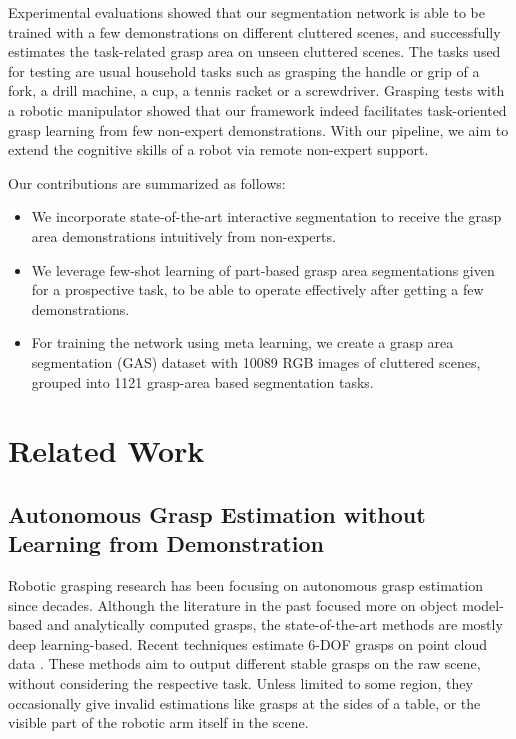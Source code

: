\documentclass[letterpaper]{article} %
\begin{document}
Experimental evaluations showed that our segmentation network is able to be trained with a few demonstrations on different cluttered scenes, and successfully estimates the task-related grasp area on unseen cluttered scenes. The tasks used for testing are usual household tasks such as grasping the handle or grip of a fork, a drill machine, a cup, a tennis racket or a screwdriver. Grasping tests with a robotic manipulator showed that our framework indeed facilitates task-oriented grasp learning from few non-expert demonstrations. With our pipeline, we aim to extend the cognitive skills of a robot via remote non-expert support.

Our contributions are summarized as follows:
\begin{itemize}
\item We incorporate state-of-the-art interactive segmentation to receive the grasp area demonstrations intuitively from non-experts. 

\item We leverage few-shot learning of part-based grasp area segmentations given for a prospective task, to be able to operate effectively after getting a few demonstrations.

\item For training the network using meta learning, we create a  grasp area segmentation (GAS) dataset with 10089 RGB images of cluttered scenes, grouped into 1121 grasp-area based segmentation tasks. 
\end{itemize}


\section{Related Work}
\label{sec:related}

\subsection{Autonomous Grasp Estimation without Learning from Demonstration}
Robotic grasping research has been focusing on autonomous grasp estimation since decades. Although the literature in the past focused more on object model-based and analytically computed grasps, the state-of-the-art methods are mostly deep learning-based. Recent techniques estimate 6-DOF grasps on point cloud data  \cite{sundermeyer2021contact,mousavian20196,fang2020graspnet,liang2019pointnetgpd}.
These methods aim to output different stable grasps on the raw scene, without considering the respective task. Unless limited to some region, they occasionally give invalid estimations like grasps at the sides of a table, or the visible part of the robotic arm itself in the scene. 
\end{document}
